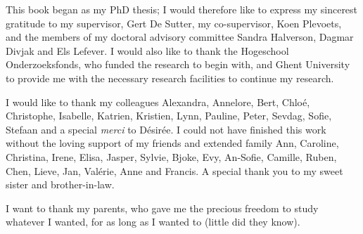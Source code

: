 

This book began as my PhD thesis; I would therefore like to express my sincerest gratitude to my supervisor, Gert De Sutter, my co-supervisor, Koen Plevoets, and the members of my doctoral advisory committee Sandra Halverson, Dagmar Divjak and Els Lefever. I would also like to thank the Hogeschool Onderzoeksfonds, who funded the research to begin with, and Ghent University to provide me with the necessary research facilities to continue my research.



I would like to thank my colleagues Alexandra, Annelore, Bert, Chloé, Christophe, Isabelle, Katrien, Kristien, Lynn, Pauline, Peter, Sevdag, Sofie, Stefaan and a special \textit{merci} to Désirée. I could not have finished this work without the loving support of my friends and extended family Ann, Caroline, Christina, Irene, Elisa, Jasper, Sylvie, Bjoke, Evy, An-Sofie, Camille, Ruben, Chen, Lieve, Jan, Valérie, Anne and Francis. A special thank you to my sweet sister and brother-in-law.



I want to thank my parents, who gave me the precious freedom to study whatever I wanted, for as long as I wanted to (little did they know).
